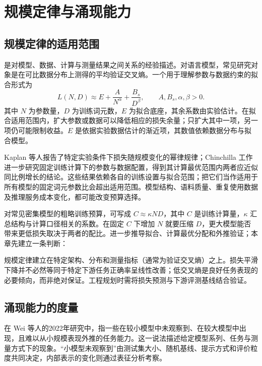 \documentclass[../textbook.tex]{subfiles}
\begin{document}
\section{规模定律与涌现能力}

\label{sec:intro-scaling-emergence}
\subsection{规模定律的适用范围}
是对模型、数据、计算与测量结果之间关系的经验描述。对语言模型，常见研究对象是在可比数据分布上测得的平均验证交叉熵。一个用于理解参数与数据约束的拟合形式为
\begin{equation}
 L(N,D)\approx E+\frac{A}{N^{\alpha}}+\frac{B_s}{D^{\beta}},
 \qquad A,B_s,\alpha,\beta>0.
\end{equation}
其中 $N$ 为参数量，$D$ 为训练词元数，$E$ 为拟合底座，其余系数由实验估计。在拟合适用范围内，扩大参数或数据可以降低相应的损失余量；只扩大其中一项，另一项仍可能限制收益。$E$ 是依据实验数据估计的渐近项，其数值依赖数据分布与拟合模型。

Kaplan 等人报告了特定实验条件下损失随规模变化的幂律规律；Chinchilla 工作进一步研究固定训练计算下的参数与数据配置，得到其计算最优范围内两者应近似同比例增长的结论\cite{kaplan2020scaling,hoffmann2022chinchilla}。这些结果依赖各自的训练设置与拟合范围；把它们当作适用于所有模型的固定词元参数比会超出适用范围。模型结构、语料质量、重复使用数据及推理服务成本变化，都可能改变预算选择。

对常见密集模型的粗略训练预算，可写成 $C\approx\kappa ND$，其中 $C$ 是训练计算量，$\kappa$ 汇总结构与计算口径相关的系数。在固定 $C$ 下增加 $N$ 就要压缩 $D$，更大模型能否带来更低损失取决于两者的配比。进一步推导拟合、计算最优分配和外推验证；本章先建立一条判断：

\begin{note}[规模定律的经验性质与任务外推边界]
规模定律建立在特定架构、分布和测量指标（通常为验证交叉熵）之上。损失平滑下降并不必然等同于特定下游任务正确率呈线性改善；低交叉熵是良好任务表现的必要倾向，而非绝对保证。工程规划时需将损失预测与下游评测基线结合验证。
\end{note}

\subsection{涌现能力的度量}
在 Wei 等人的2022年研究中，指一些在较小模型中未观察到、在较大模型中出现，且难以从小规模表现外推的任务能力\cite{wei2022emergent}。这一说法描述给定模型系列、任务与测量方式下的现象。“小模型未观察到”由测试集大小、随机基线、提示方式和评价粒度共同决定，内部表示的变化则通过表征分析考察。
\end{document}
